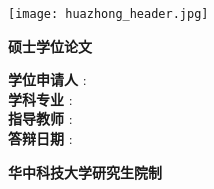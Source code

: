 \begin{titlepage}

\begin{CJK*}{UTF8}{gkai}
    
\centering
    
    \texttt{[image: huazhong\_header.jpg]}
    
\vspace{0.5cm}    
    
    {\fontsize{50}{60}
    \textbf{硕士学位论文}}
    
\vspace{1.8cm}
\Large

    \textbf{\mychtitle}
    
\vspace{1.8cm}
    
\flushleft
\setlength{\leftskip}{3cm}
\Large
    \textbf{学位申请人} \hspace{0.05cm} : \hspace{0.3cm}  \studentid \\
    \textbf{学科专业}  \hspace{0.2cm} : \hspace{0.3cm}  \myauthor \\
    \textbf{指导教师} \hspace{0.2cm}  : \hspace{0.3cm}  \advisorchinese \\
    \textbf{答辩日期} \hspace{0.2cm}  : \hspace{0.3cm}  \schoolchinese

\vfill
\centering

    \textbf{
    华中科技大学研究生院制
}

\end{CJK*}

\end{titlepage}